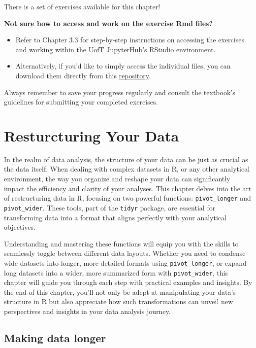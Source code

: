 \documentclass[
]{book}
\begin{document}
There is a set of exercises available for this chapter!

\textbf{Not sure how to access and work on the exercise Rmd files? }

\begin{itemize}
\item
  Refer to Chapter 3.3 for step-by-step instructions on accessing the exercises and working within the UofT JupyterHub's RStudio environment.
\item
  Alternatively, if you'd like to simply access the individual files, you can download them directly from this \href{https://github.com/UofTChem-Teaching/R4EnvChem-Exercises}{repository}.
\end{itemize}

Always remember to save your progress regularly and consult the textbook's guidelines for submitting your completed exercises.

\hypertarget{resturcturing-your-data}{%
\chapter{Resturcturing Your Data}\label{resturcturing-your-data}}

In the realm of data analysis, the structure of your data can be just as crucial as the data itself. When dealing with complex datasets in R, or any other analytical environment, the way you organize and reshape your data can significantly impact the efficiency and clarity of your analyses. This chapter delves into the art of restructuring data in R, focusing on two powerful functions: \texttt{pivot\_longer} and \texttt{pivot\_wider}. These tools, part of the \texttt{tidyr} package, are essential for transforming data into a format that aligns perfectly with your analytical objectives.

Understanding and mastering these functions will equip you with the skills to seamlessly toggle between different data layouts. Whether you need to condense wide datasets into longer, more detailed formats using \texttt{pivot\_longer}, or expand long datasets into a wider, more summarized form with \texttt{pivot\_wider}, this chapter will guide you through each step with practical examples and insights. By the end of this chapter, you'll not only be adept at manipulating your data's structure in R but also appreciate how such transformations can unveil new perspectives and insights in your data analysis journey.

\hypertarget{making-data-longer}{%
\section{Making data longer}\label{making-data-longer}}
\end{document}
